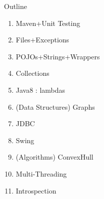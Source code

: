 \documentclass[English,t,%
hyperref={%
    pdftitle={FISA-DE2 OOP in Java},%
    pdfauthor={Guillaume Muller},%
    pdfsubject={OOP in Java},%
    pdfkeywords={OOP, Java}%
    },%
xcolor={pdftex,svgnames} %
]{beamer}
\begin{document}
\begin{frame}{Outline}

  \begin{enumerate}
    \item Maven+Unit Testing
    \item Files+Exceptions
    \item POJOs+Strings+Wrappers
    \item Collections
    \item Java8 : lambdas
    \item (Data Structures) Graphs
    \item JDBC
    \item Swing
    \item (Algorithms) ConvexHull
    \item Multi-Threading
    \item Introspection
  \end{enumerate}

\end{frame}
\end{document}
